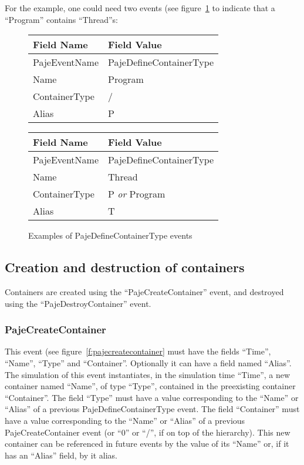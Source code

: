For the example, one could need two events (see
figure~\ref{f:definecontainerexample} to indicate
that a ``Program'' contains ``Thread''s:

\begin{figure}[htbp]
\begin{center}
\begin{tabular}{|LL|}
\hline
\textbf{Field Name} & \textbf{Field Value} \\
\hline
PajeEventName & PajeDefineContainerType \\
Name          & Program\\
ContainerType & /\\
Alias         & P\\
\hline
\end{tabular}%
\quad%
\begin{tabular}{|LL|}
\hline
\textbf{Field Name} & \textbf{Field Value} \\
\hline
PajeEventName & PajeDefineContainerType \\
Name          & Thread\\
ContainerType & P \emph{or} Program\\
Alias         & T\\
\hline
\end{tabular}%
\end{center}%
\caption{Examples of PajeDefineContainerType events}
\label{f:definecontainerexample}
\end{figure}




\subsection{Creation and destruction of containers}
\label{sec:instant}

Containers are created using the ``PajeCreateContainer'' event, and destroyed using
the ``PajeDestroyContainer'' event.

\subsubsection*{PajeCreateContainer}

This event (see figure~\ref{f:pajecreatecontainer} must have the fields
``Time'', ``Name'', ``Type'' and ``Container''. Optionally
it can have a field named ``Alias''. The simulation of this event instantiates,
in the simulation time ``Time'', a
new container named ``Name'', of type
``Type'', contained in the preexisting
container ``Container''.
The field ``Type'' must have a value corresponding to the ``Name'' or ``Alias''
of a previous
PajeDefineContainerType event. The field ``Container'' must have a value
corresponding to the ``Name'' or ``Alias''
of a previous PajeCreateContainer event (or ``0'' or ``/'', if on top of the hierarchy).
This new container can be referenced in future events by the value of its
``Name'' or, if it has an ``Alias'' field, by it alias.

